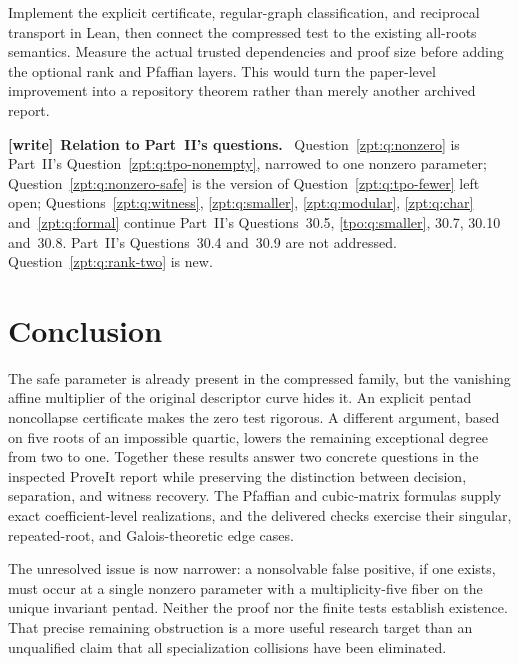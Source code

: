 \documentclass[11pt,letterpaper]{article}
\numberwithin{equation}{section}
\theoremstyle{definition}
\theoremstyle{remark}
\newenvironment{writenote}[1][]{\par\smallskip\begingroup\small
 \noindent\textbf{[write]}\if\relax\detokenize{#1}\relax\else~\textbf{#1.}\fi\ }%
 {\par\endgroup\smallskip}
\begin{document}
\begin{question}
\label{zpt:q:formal}
Implement the explicit certificate, regular-graph classification, and
reciprocal transport in Lean, then connect the compressed test to the
existing all-roots semantics. Measure the actual trusted dependencies and
proof size before adding the optional rank and Pfaffian layers. This
would turn the paper-level improvement into a repository theorem rather
than merely another archived report.
\end{question}

\begin{writenote}[Relation to Part~II's questions]
Question~\ref{zpt:q:nonzero} is Part~II's Question~\ref{zpt:q:tpo-nonempty},
narrowed to one nonzero parameter; Question~\ref{zpt:q:nonzero-safe} is the
version of Question~\ref{zpt:q:tpo-fewer} left open;
Questions~\ref{zpt:q:witness}, \ref{zpt:q:smaller}, \ref{zpt:q:modular},
\ref{zpt:q:char} and~\ref{zpt:q:formal} continue Part~II's
Questions~30.5, \ref{tpo:q:smaller}, 30.7, 30.10 and~30.8. Part~II's
Questions~30.4 and~30.9 are not addressed. Question~\ref{zpt:q:rank-two} is
new.
\end{writenote}

\section{Conclusion}
The safe parameter is already present in the compressed family, but the
vanishing affine multiplier of the original descriptor curve hides it.
An explicit pentad noncollapse certificate makes the zero test rigorous.
A different argument, based on five roots of an impossible quartic, lowers
the remaining exceptional degree from two to one. Together these results
answer two concrete questions in the inspected ProveIt report while
preserving the distinction between decision, separation, and witness
recovery. The Pfaffian and cubic-matrix formulas supply exact
coefficient-level realizations, and the delivered checks exercise their
singular, repeated-root, and Galois-theoretic edge cases.

The unresolved issue is now narrower: a nonsolvable false positive, if one
exists, must occur at a single nonzero parameter with a multiplicity-five
fiber on the unique invariant pentad. Neither the proof nor the finite
tests establish existence. That precise remaining obstruction is a more
useful research target than an unqualified claim that all specialization
collisions have been eliminated.
\end{document}
